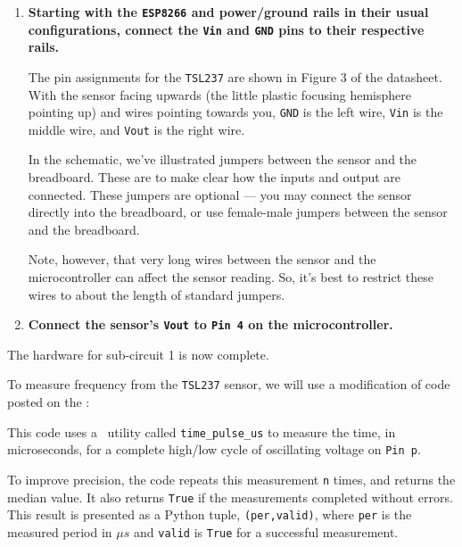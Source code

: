 \begin{enumerate}
	\item \textbf{Starting with the \texttt{ESP8266} and power/ground rails in their usual configurations, connect the \texttt{Vin} and \texttt{GND} pins to their respective rails.}
	
	The pin assignments for the \texttt{TSL237} are shown in Figure 3 of the datasheet.
	With the sensor facing upwards (the little plastic focusing hemisphere pointing up) and wires pointing towards you, \texttt{GND} is the left wire, \texttt{Vin} is the middle wire, and \texttt{Vout} is the right wire.

	\smallskip
	In the schematic, we've illustrated jumpers between the sensor and the breadboard.
	These are to make clear how the inputs and output are connected. 
	These jumpers are optional --- you may connect the sensor directly into the breadboard, or use female-male jumpers between the sensor and the breadboard.
	
	\smallskip
	Note, however, that very long wires between the sensor and the microcontroller can affect the sensor reading.
	So, it's best to restrict these wires to about the length of standard jumpers.	

	\item \textbf{Connect the sensor's \texttt{Vout} to \texttt{Pin 4} on the microcontroller.}
	
\end{enumerate}
The hardware for sub-circuit 1 is now complete.

\smallskip
To measure frequency from the \texttt{TSL237} sensor, we will use a modification of code posted on the :

This code uses a \Micropython \, utility called \lstinline{time_pulse_us} to measure the time, in microseconds, for a complete high/low cycle of oscillating voltage on \texttt{Pin p}.

To improve precision, the code repeats this measurement \texttt{n} times, and returns the median value. 
It also returns \texttt{True} if the measurements completed without errors.
This result is presented as a Python tuple, \lstinline{(per,valid)}, where \lstinline{per} is the measured period in $\mu s$ and \lstinline{valid} is \texttt{True} for a successful measurement.

